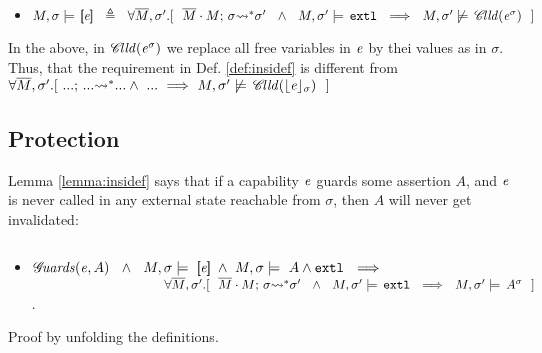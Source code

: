\documentclass[acmsmall,review,anonymous,screen]{acmart}\settopmatter{printfolios=true,printacmref=false}
\begin{document}
{\begin{definition}
\begin{itemize}
\item
$M, \sigma \models \,  [\!\![ \mathit{e} ]\!\!]  \   \ \triangleq \ \    \forall \overline{M}, \sigma'.
 [ 
 \ \  \overline{M}\cdot M;\, {\sigma} {\rightsquigarrow^*} \sigma'\ \ \wedge\ \ M, \sigma' \models \,  \mbox{\normalfont{\texttt{extl}}}
  \ \  \Longrightarrow\ \ M, {\sigma'}  \not \models \,   {\mathcal C\!{\mathit{lld}}(\mathit{e}^{\sigma})}\ \ ] $
\end{itemize}
\end{definition}

In the above, in  $ {\mathcal C\!{\mathit{lld}}(\mathit{e}^{\sigma})}$ we replace all free variables in $\mathit{e}$ by thei values as in $\sigma$.
Thus, that the requirement in Def. \ref{def:insidef} is different from
$ \forall \overline{M}, \sigma'. [ \  ...;\, {...} {\rightsquigarrow^*} ...  \wedge\  ...
\   \Longrightarrow\   M, \sigma' \not \models \,   {\mathcal C\!{\mathit{lld}}(\lfloor \mathit{e} \rfloor_{\sigma})}\ \ ] $

\subsection{Protection}

Lemma \ref{lemma:insidef} says that if a capability $\mathit{e}$ guards some assertion $A$, and $\mathit{e}$ is never called in any external  state reachable from $\sigma$, then $A$ will never get invalidated:

\begin{lemma}
$~ $ \\
\label{lemma:insidef}
\begin{itemize}

\item
$ {\mathcal G}\!\mathit{uards}( {\mathit{e}}, {A}) \ \ \wedge\ \ M, \sigma \models \  [\!\![ \mathit{e} ]\!\!] \ \wedge \  M, \sigma \models \  A \wedge \mbox{\normalfont{\texttt{extl}}} \ \ \Longrightarrow $\\
$\strut \hspace{3.6cm}\forall \Mtwo,  \sigma'.[\ \   \leadstoBoundedStar  {\Mtwo\cdot M} {\sigma} {\sigma'}\ \ \wedge\ \ M, \sigma' \models \,  \extThis  \ \  \Longrightarrow\ \ M,  \sigma'  \models\,  \as A \sigma \ \ ]$.
\end{itemize}
\end{lemma}

Proof by unfolding the definitions. 
 
}
\end{document}
